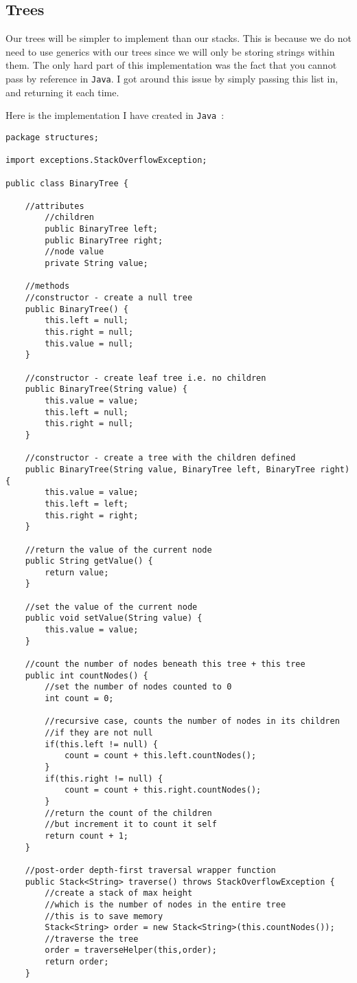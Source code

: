 \documentclass[../../../../../main.tex]{subfiles}
\begin{document}
\subsection{Trees}
Our trees will be simpler to implement than our stacks. This is because we do not need to use generics with our trees since we will only be storing strings within them. The only hard part of this implementation was the fact that you cannot pass by reference in \texttt{Java}. I got around this issue by simply passing this list in, and returning it each time.

Here is the implementation I have created in \texttt{Java
}:
\begin{verbatim}
package structures;

import exceptions.StackOverflowException;

public class BinaryTree {
	
	//attributes
		//children
		public BinaryTree left;
		public BinaryTree right;
		//node value
		private String value;
	
	//methods
	//constructor - create a null tree
	public BinaryTree() {
		this.left = null;
		this.right = null;
		this.value = null;
	}
	
	//constructor - create leaf tree i.e. no children
	public BinaryTree(String value) {
		this.value = value;
		this.left = null;
		this.right = null;
	}
	
	//constructor - create a tree with the children defined
	public BinaryTree(String value, BinaryTree left, BinaryTree right) {
		this.value = value;
		this.left = left;
		this.right = right;
	}
	
	//return the value of the current node
	public String getValue() {
		return value;
	}

	//set the value of the current node
	public void setValue(String value) {
		this.value = value;
	}
	
	//count the number of nodes beneath this tree + this tree
	public int countNodes() {
		//set the number of nodes counted to 0
		int count = 0;
		
		//recursive case, counts the number of nodes in its children
		//if they are not null
		if(this.left != null) {
			count = count + this.left.countNodes();
		}
		if(this.right != null) {
			count = count + this.right.countNodes();
		}
		//return the count of the children
		//but increment it to count it self
		return count + 1;
	}
	
	//post-order depth-first traversal wrapper function
	public Stack<String> traverse() throws StackOverflowException {
		//create a stack of max height
		//which is the number of nodes in the entire tree
		//this is to save memory
		Stack<String> order = new Stack<String>(this.countNodes());
		//traverse the tree
		order = traverseHelper(this,order);
		return order;
	}
	

\end{verbatim}
\end{document}
